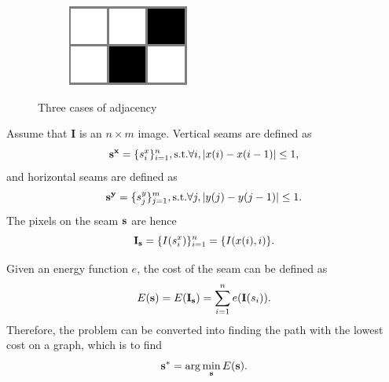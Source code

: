 \documentclass[final]{cvpr}
\begin{document}
\begin{figure}[htb]
\begin{center}
\begin{subfigure}[b]{0.30\linewidth}
\end{subfigure}
\begin{subfigure}[b]{0.30\linewidth}
    \includegraphics[width=\textwidth]{to_left.png}
\end{subfigure}
\end{center}
\caption{Three cases of adjacency}
\label{fig:adjacency}
\end{figure}

Assume that $\textbf{I}$ is an $n\times m$ image.
Vertical seams are defined as
\begin{equation}
    \textbf s^\textbf x=\{s^x_i\}_{i=1}^n,\text{s.t.}\forall i,|x(i)-x(i-1)|\le1,
    \label{eq:vertical_seam}
\end{equation}
and horizontal seams are defined as
\begin{equation}
    \textbf s^\textbf y=\{s^y_j\}_{j=1}^m,\text{s.t.}\forall j,|y(j)-y(j-1)|\le1.
    \label{eq:horizontal_seam}
\end{equation}
The pixels on the seam $\textbf s$ are hence
\begin{equation}
    \textbf I_\textbf s=\{I(s^x_i)\}_{i=1}^n=\{I(x(i),i)\}.
    \label{eq:pixel_on_vertical_seam}
\end{equation}

Given an energy function $e$, the cost of the seam can be defined as
\begin{equation}
    E(\textbf s)=E(\textbf I_\textbf s)=\sum_{i=1}^ne(\textbf I(s_i)).
    \label{eq:energy_of_seam}
\end{equation}
Therefore, the problem can be converted into finding the path with the lowest cost on a graph, which is to find
\begin{equation}
    \textbf s^*=\arg\min\limits_\textbf sE(\textbf s).
    \label{eq:solution_of_optimal_seam}
\end{equation}
\end{document}
